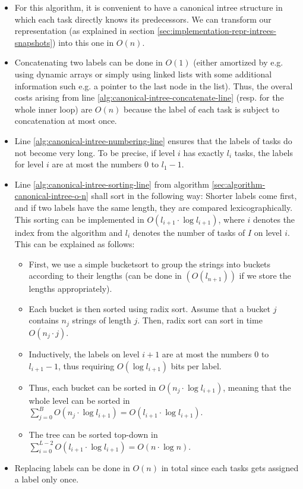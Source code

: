 \begin{itemize}
\item For this algorithm, it is convenient to have a canonical intree structure in which each task directly knows its predecessors. We can transform our representation (as explained in section \ref{sec:implementation-repr-intrees-snapshots}) into this one in $O(n)$.
\item Concatenating two labels can be done in $O(1)$ (either amortized by e.g. using dynamic arrays or simply using linked lists with some additional information such e.g. a pointer to the last node in the list). Thus, the overal costs arising from line \ref{alg:canonical-intree-concatenate-line} (resp. for the whole inner loop) are $O(n)$ because the label of each task is subject to concatenation at most once.
\item Line \ref{alg:canonical-intree-numbering-line} ensures that the labels of tasks do not become very long. To be precise, if level $i$ has exactly $l_i$ tasks, the labels for level $i$ are at most the numbers 0 to $l_1-1$.
\item Line \ref{alg:canonical-intree-sorting-line} from algorithm \ref{sec:algorithm-canonical-intree-o-n} shall sort in the following way: Shorter labels come first, and if two labels have the same length, they are compared lexicographically. This sorting can be implemented in $O(l_{i+1}\cdot\log l_{i+1})$, where $i$ denotes the index from the algorithm and $l_i$ denotes the number of tasks of $I$ on level $i$. This can be explained as follows:
  \begin{itemize}
  \item First, we use a simple bucketsort to group the strings into buckets according to their lengths (can be done in $(O(l_{n+1}))$ if we store the lengths appropriately).
  \item Each bucket is then sorted using radix sort. Assume that a bucket $j$ contains $n_j$ strings of length $j$. Then, radix sort can sort in time $O(n_j \cdot j)$.
  \item Inductively, the labels on level $i+1$ are at most the numbers 0 to $l_{i+1}-1$, thus requiring $O(\log l_{i+1})$ bits per label.
  \item Thus, each bucket can be sorted in $O(n_j \cdot \log l_{i+1})$, meaning that the whole level can be sorted in $\sum_{j=0}^B O(n_j \cdot \log l_{i+1}) = O(l_{i+1} \cdot \log l_{i+1})$.
  \item The tree can be sorted top-down in $\sum_{i=0}^{L-2}O(l_{i+1} \cdot \log l_{i+1})=O(n\cdot \log n)$.
  \end{itemize}
\item Replacing labels can be done in $O(n)$ in total since each tasks gets assigned a label only once.
\end{itemize}

